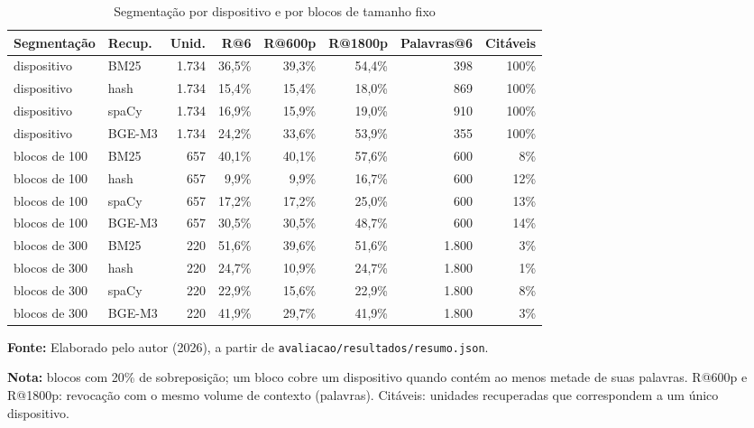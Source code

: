 \begin{table}[htbp]
\caption{Segmentação por dispositivo e por blocos de tamanho fixo}\label{tab:segmentacao}
\centering\footnotesize
\setlength{\tabcolsep}{4pt}
\begin{tabular}{llrrrrrr}
\toprule
Segmentação & Recup. & Unid. & R@6 & R@600p & R@1800p & Palavras@6 & Citáveis \\
\midrule
dispositivo & BM25 & 1.734 & 36,5\% & 39,3\% & 54,4\% & 398 & 100\% \\
dispositivo & hash & 1.734 & 15,4\% & 15,4\% & 18,0\% & 869 & 100\% \\
dispositivo & spaCy & 1.734 & 16,9\% & 15,9\% & 19,0\% & 910 & 100\% \\
dispositivo & BGE-M3 & 1.734 & 24,2\% & 33,6\% & 53,9\% & 355 & 100\% \\
blocos de 100 & BM25 & 657 & 40,1\% & 40,1\% & 57,6\% & 600 & 8\% \\
blocos de 100 & hash & 657 & 9,9\% & 9,9\% & 16,7\% & 600 & 12\% \\
blocos de 100 & spaCy & 657 & 17,2\% & 17,2\% & 25,0\% & 600 & 13\% \\
blocos de 100 & BGE-M3 & 657 & 30,5\% & 30,5\% & 48,7\% & 600 & 14\% \\
blocos de 300 & BM25 & 220 & 51,6\% & 39,6\% & 51,6\% & 1.800 & 3\% \\
blocos de 300 & hash & 220 & 24,7\% & 10,9\% & 24,7\% & 1.800 & 1\% \\
blocos de 300 & spaCy & 220 & 22,9\% & 15,6\% & 22,9\% & 1.800 & 8\% \\
blocos de 300 & BGE-M3 & 220 & 41,9\% & 29,7\% & 41,9\% & 1.800 & 3\% \\
\bottomrule
\end{tabular}
\par\smallskip
\begin{minipage}{\linewidth}{\small \textbf{Fonte:} Elaborado pelo autor (2026), a partir de \texttt{avaliacao/resultados/resumo.json}.}\par
{\small \textbf{Nota:} blocos com 20\% de sobreposição; um bloco cobre um dispositivo quando contém ao menos metade de suas palavras. R@600p e R@1800p: revocação com o mesmo volume de contexto (palavras). Citáveis: unidades recuperadas que correspondem a um único dispositivo.}\end{minipage}
\end{table}
